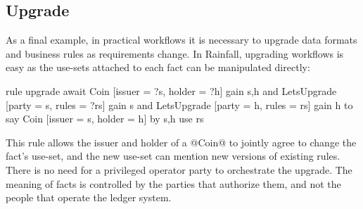 \subsection{Upgrade}
\label{s:Upgrade}
As a final example, in practical workflows it is necessary to upgrade data formats and business rules as requirements change. In Rainfall, upgrading workflows is easy as the use-sets attached to each fact can be manipulated directly:

\begin{small}
\begin{code}
  rule   upgrade
  await  Coin [issuer = ?s, holder = ?h]      gain {s,h}
     and LetsUpgrade [party = s, rules = ?rs] gain {s}
     and LetsUpgrade [party = h, rules =  rs] gain {h}
  to say Coin [issuer = s, holder = h]
      by {s,h} use rs
\end{code}
\end{small}

This rule allows the issuer and holder of a @Coin@ to jointly agree to change the fact's use-set, and the new use-set can mention new versions of existing rules. There is no need for a privileged operator party to orchestrate the upgrade. The meaning of facts is controlled by the parties that authorize them, and not the people that operate the ledger system.


